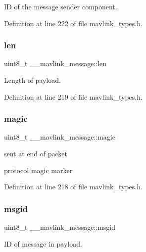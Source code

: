 ID of the message sender component. 



Definition at line 222 of file mavlink\+\_\+types.\+h.

\mbox{\label{struct____mavlink__message_a6a405c678e4b9fe57e5e621c5bcd4841}} 
\subsubsection{\texorpdfstring{len}{len}}
{\footnotesize\ttfamily uint8\+\_\+t \+\_\+\+\_\+mavlink\+\_\+message\+::len}



Length of payload. 



Definition at line 219 of file mavlink\+\_\+types.\+h.

\mbox{\label{struct____mavlink__message_a2e6ee9d46821aea33a08231dea000355}} 
\subsubsection{\texorpdfstring{magic}{magic}}
{\footnotesize\ttfamily uint8\+\_\+t \+\_\+\+\_\+mavlink\+\_\+message\+::magic}



sent at end of packet 

protocol magic marker 

Definition at line 218 of file mavlink\+\_\+types.\+h.

\mbox{\label{struct____mavlink__message_a8d95b61c61b9086bada158104828d593}} 
\subsubsection{\texorpdfstring{msgid}{msgid}}
{\footnotesize\ttfamily uint8\+\_\+t \+\_\+\+\_\+mavlink\+\_\+message\+::msgid}



ID of message in payload. 



